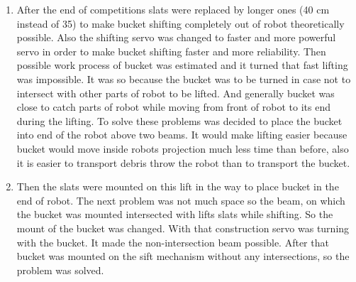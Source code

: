 \begin{enumerate}
  \item After the end of competitions slats were replaced by longer ones (40 cm instead of 35) to make bucket shifting completely out of robot theoretically possible. Also the shifting servo was changed to faster and more powerful servo in order to make bucket shifting faster and more reliability. Then possible work process of bucket was estimated and it turned that fast lifting was impossible. It was so because the bucket was to be turned in case not to intersect with other parts of robot to be lifted. And generally bucket was close to catch parts of robot while moving from front of robot to its end during the lifting. To solve these problems was decided to place the bucket into end of the robot above two beams. It would make lifting easier because bucket would move inside robots projection much less time than before, also it is easier to transport debris throw the robot than to transport the bucket.
  \item Then the slats were mounted on this lift in the way to place bucket in the end of robot. The next problem was not much space so the beam, on which the bucket was mounted intersected with lifts slats while shifting. So the mount of the bucket was changed. 
  With that construction servo was turning with the bucket. It made the non-intersection beam possible. After that bucket was mounted on the sift mechanism without any intersections, so the problem was solved.
  

\end{enumerate}
